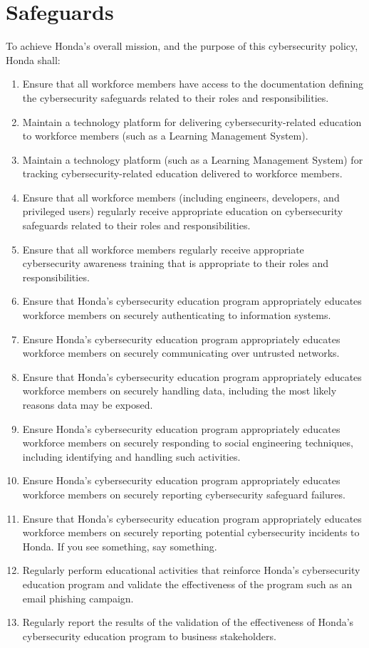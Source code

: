 \section{Safeguards}
To achieve Honda's overall mission, and the purpose of this cybersecurity policy, Honda shall:
\begin{enumerate}
\item Ensure that all workforce members have access to the documentation defining the cybersecurity safeguards related to their roles and responsibilities.
\item Maintain a technology platform for delivering cybersecurity-related education to workforce members (such as a Learning Management System).
\item Maintain a technology platform (such as a Learning Management System) for tracking cybersecurity-related education delivered to workforce members.
\item Ensure that all workforce members (including engineers, developers, and privileged users) regularly receive appropriate education on cybersecurity safeguards related to their roles and responsibilities.
\item Ensure that all workforce members regularly receive appropriate cybersecurity awareness training that is appropriate to their roles and responsibilities.
\item Ensure that Honda's cybersecurity education program appropriately educates workforce members on securely authenticating to information systems.
\item Ensure Honda's cybersecurity education program appropriately educates workforce members on securely communicating over untrusted networks.
\item Ensure that Honda's cybersecurity education program appropriately educates workforce members on securely handling data, including the most likely reasons data may be exposed.
\item Ensure Honda's cybersecurity education program appropriately educates workforce members on securely responding to social engineering techniques, including identifying and handling such activities.
\item Ensure Honda's cybersecurity education program appropriately educates workforce members on securely reporting cybersecurity safeguard failures.
\item Ensure that Honda's cybersecurity education program appropriately educates workforce members on securely reporting potential cybersecurity incidents to Honda. If you see something, say something. 
\item Regularly perform educational activities that reinforce Honda's cybersecurity education program and validate the effectiveness of the program such as an email phishing campaign.
\item Regularly report the results of the validation of the effectiveness of Honda’s cybersecurity education program to business stakeholders.
\end{enumerate}
